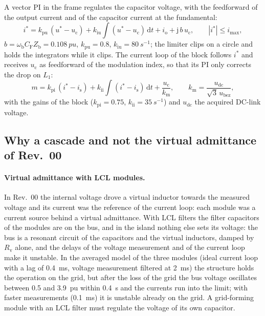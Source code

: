 \documentclass[11pt,a4paper]{scrartcl}
\newcommand{\ped}[1]{_{\mathrm{#1}}}
\newcommand{\jj}{\mathrm{j}}
\newcommand{\dif}{\mathrm{d}}
\begin{document}
\begin{onehalfspace}
A vector PI in the frame regulates the capacitor voltage, with the feedforward of the output current and of the capacitor current at the fundamental:
\begin{equation}
	i^* = k\ped{pu}\,(u^* - u\ped{c}) + k\ped{iu}\!\int (u^* - u\ped{c})\,\dif t + i\ped{o} + \jj\, b\, u\ped{c}, \qquad |i^*| \le i\ped{max},
	\label{eq:vloop}
\end{equation}
$b = \omega\ped{b} C\ped{F} Z\ped{b} = \SI{0.108}{pu}$, $k\ped{pu} = 0.8$, $k\ped{iu} = \SI{80}{s^{-1}}$; the limiter clips on a circle and holds the integrators while it clips. The current loop of the block follows $i^*$ and receives $u\ped{c}$ as feedforward of the modulation index, so that its PI only corrects the drop on $L_1$:
\begin{equation}
	m = k\ped{pi}\,(i^* - i\ped{s}) + k\ped{ii}\!\int (i^* - i\ped{s})\,\dif t + \frac{u\ped{c}}{k\ped{m}}, \qquad k\ped{m} = \frac{u\ped{dc}}{\sqrt3\, u\ped{bez}},
	\label{eq:cl}
\end{equation}
with the gains of the block ($k\ped{pi} = 0.75$, $k\ped{ii} = \SI{35}{s^{-1}}$) and $u\ped{dc}$ the acquired DC-link voltage.

\subsection{Why a cascade and not the virtual admittance of Rev.~00}
\label{sec:whycascade}

\paragraph{Virtual admittance with LCL modules.} In Rev.~00 the internal voltage drove a virtual inductor towards the measured voltage and its current was the reference of the current loop: each module was a current source behind a virtual admittance. With LCL filters the filter capacitors of the modules are on the bus, and in the island nothing else sets its voltage: the bus is a resonant circuit of the capacitors and the virtual inductors, damped by $R\ped{v}$ alone, and the delays of the voltage measurement and of the current loop make it unstable. In the averaged model of the three modules (ideal current loop with a lag of \SI{0.4}{ms}, voltage measurement filtered at \SI{2}{ms}) the structure holds the operation on the grid, but after the loss of the grid the bus voltage oscillates between 0.5 and \SI{3.9}{pu} within \SI{0.4}{s} and the currents run into the limit; with faster measurements (\SI{0.1}{ms}) it is unstable already on the grid. A grid-forming module with an LCL filter must regulate the voltage of its own capacitor.


\end{onehalfspace}
\end{document}
